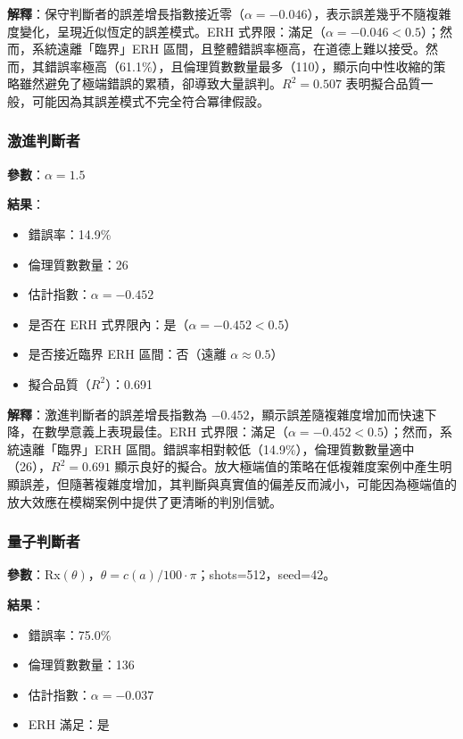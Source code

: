\documentclass[12pt,a4paper]{article}
\theoremstyle{definition}
\theoremstyle{remark}
\begin{document}
\textbf{解釋}：保守判斷者的誤差增長指數接近零（$\alpha = -0.046$），表示誤差幾乎不隨複雜度變化，呈現近似恆定的誤差模式。ERH 式界限：滿足（$\alpha = -0.046 < 0.5$）；然而，系統遠離「臨界」ERH 區間，且整體錯誤率極高，在道德上難以接受。然而，其錯誤率極高（61.1\%），且倫理質數數量最多（110），顯示向中性收縮的策略雖然避免了極端錯誤的累積，卻導致大量誤判。$R^2 = 0.507$ 表明擬合品質一般，可能因為其誤差模式不完全符合冪律假設。

\subsubsection{激進判斷者}

\textbf{參數}：$\alpha = 1.5$

\textbf{結果}：
\begin{itemize}
    \item 錯誤率：14.9\%
    \item 倫理質數數量：26
    \item 估計指數：$\alpha = -0.452$
    \item 是否在 ERH 式界限內：是（$\alpha = -0.452 < 0.5$）
    \item 是否接近臨界 ERH 區間：否（遠離 $\alpha \approx 0.5$）
    \item 擬合品質（$R^2$）：0.691
\end{itemize}

\textbf{解釋}：激進判斷者的誤差增長指數為 $-0.452$，顯示誤差隨複雜度增加而快速下降，在數學意義上表現最佳。ERH 式界限：滿足（$\alpha = -0.452 < 0.5$）；然而，系統遠離「臨界」ERH 區間。錯誤率相對較低（14.9\%），倫理質數數量適中（26），$R^2 = 0.691$ 顯示良好的擬合。放大極端值的策略在低複雜度案例中產生明顯誤差，但隨著複雜度增加，其判斷與真實值的偏差反而減小，可能因為極端值的放大效應在模糊案例中提供了更清晰的判別信號。

\subsubsection{量子判斷者}

\textbf{參數}：Rx$(\theta)$，$\theta = c(a)/100 \cdot \pi$；shots=512，seed=42。

\textbf{結果}：
\begin{itemize}
    \item 錯誤率：75.0\%
    \item 倫理質數數量：136
    \item 估計指數：$\alpha = -0.037$
    \item ERH 滿足：是
\end{itemize}
\end{document}
